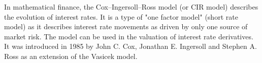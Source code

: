 In mathematical finance, the Cox–Ingersoll–Ross model (or CIR model) describes the evolution of interest rates. 
It is a type of "one factor model" (short rate model) as it describes interest rate movements as driven by only one source 
of market risk. The model can be used in the valuation of interest rate derivatives. 
It was introduced in 1985 by John C. Cox, Jonathan E. Ingersoll and Stephen A. Ross as an extension of the Vasicek model.
